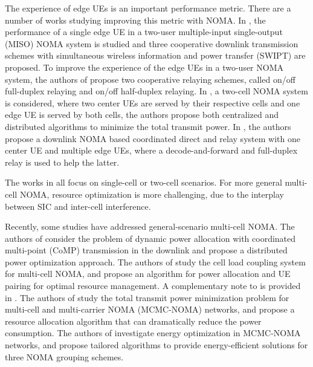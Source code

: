 \documentclass[10pt,journal,final,finalsubmission,twocolumn]{IEEEtran}
\begin{document}
The experience of edge UEs is an important performance metric. There are a number of works studying improving this metric with NOMA. In \cite{Do1}, the performance of a single edge UE in a two-user multiple-input single-output (MISO) NOMA system is studied and three cooperative downlink transmission schemes with simultaneous wireless information and power transfer (SWIPT) are proposed. To improve the experience of the edge UEs in a two-user NOMA system, the authors of \cite{Do2} propose two cooperative relaying schemes, called on/off full-duplex relaying and on/off half-duplex relaying. In \cite{Guo}, a two-cell NOMA system is considered, where two center UEs are served by their respective cells and one edge UE is served by both cells, the authors propose both centralized and distributed algorithms to minimize the total transmit power. In \cite{Pei}, the authors propose a downlink NOMA based coordinated direct and relay system with one center UE and multiple edge UEs, where a decode-and-forward and full-duplex relay is used to help the latter.

The works in \cite{Do1, Do2, Guo, Pei} all focus on single-cell or two-cell scenarios. For more general multi-cell NOMA, resource optimization is more challenging, due to the interplay between SIC and inter-cell interference.

Recently, some studies have addressed general-scenario multi-cell NOMA. The authors of \cite{Ali} consider the problem of dynamic power allocation with coordinated multi-point (CoMP) transmission in the downlink and propose a distributed power optimization approach. The authors of \cite{You1} study the cell load coupling system for multi-cell NOMA, and propose an algorithm for power allocation and UE pairing for optimal resource management. A complementary note to \cite{You1} is provided in \cite{You2}. The authors of \cite{Ni} study the total transmit power minimization problem for multi-cell and multi-carrier NOMA (MCMC-NOMA) networks, and propose a resource allocation algorithm that can dramatically reduce the power consumption. The authors of \cite{Lei} investigate energy optimization in MCMC-NOMA networks, and propose tailored algorithms to provide energy-efficient solutions for three NOMA grouping schemes.
\end{document}
